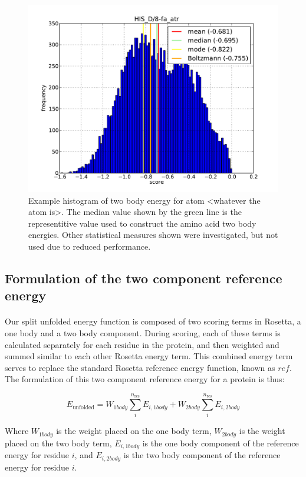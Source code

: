 \begin{figure}
  \includegraphics[width=\linewidth]{Figures/test.png}
  \caption{Example histogram of two body energy for atom <whatever the atom is>. The median value shown by the green line is the representitive value used to construct the amino acid two body energies. Other statistical measures shown were investigated, but not used due to reduced performance.}
  \label{fig:tbaedist}
\end{figure}


\subsection{Formulation of the two component reference energy}
\paragraph{}
Our split unfolded energy function is composed of two scoring terms in Rosetta, a one body and a two body component.
During scoring, each of these terms is calculated separately for each residue in the protein, and then weighted and summed similar to each other Rosetta energy term.
This combined energy term serves to replace the standard Rosetta reference energy function, known as $ref$.
The formulation of this two component reference energy for a protein is thus:

\begin{equation}
E_{\text{unfolded}} =  W_{1body} \sum_{i}^{n_{\text{res}}} E_{i,1body} +  W_{2body} \sum_{i}^{n_{\text{res}}} E_{i,2body}
\end{equation}

Where $W_{1body}$ is the weight placed on the one body term, $W_{2body}$ is the weight placed on the two body term, $E_{i,1body}$ is the one body component of the reference energy for residue $i$, and $E_{i,2body}$ is the two body component of the reference energy for residue $i$.


